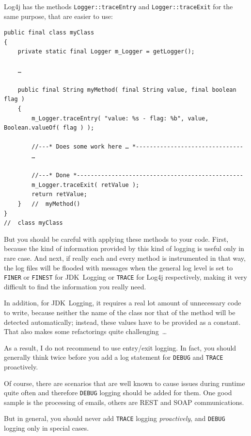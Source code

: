 \documentclass[11pt,a4paper, titlepage, parskip=half, headsepline, footsepline, cleardoublepage=current, headheight=1cm]{scrbook}
\begin{document}
Log4j has the methods \lstinline|Logger::traceEntry| and \lstinline|Logger::traceExit| for the same purpose, that are easier to use:
\begin{lstlisting}
public final class myClass
{
    private static final Logger m_Logger = getLogger();
    
	…    
    
    public final String myMethod( final String value, final boolean flag )
    {
        m_Logger.traceEntry( "value: %s - flag: %b", value, Boolean.valueOf( flag ) );
        
        //---* Does some work here … *-------------------------------
        …
    
        //---* Done *------------------------------------------------
        m_Logger.traceExit( retValue );
        return retValue;
    }   //  myMethod()
}
//  class myClass
\end{lstlisting}

But you should be careful with applying these methods to your code. First, because the kind of information provided by this kind of logging is useful only in rare case. And next, if really each and every method is instrumented in that way, the log files will be flooded with messages when the general log level is set to \verb#FINER# or \verb#FINEST# for JDK~Logging or \verb#TRACE# for Log4j respectively, making it very difficult to find the information you really need.

In addition, for JDK~Logging, it requires a real lot amount of unnecessary code to write, because neither the name of the class nor that of the method will be detected automatically; instead, these values have to be provided as a constant. That also makes some refactorings quite challenging~…

As a result, I do not recommend to use entry/exit logging. In fact, you should generally think twice before you add a log statement for \verb#DEBUG# and \verb#TRACE# proactively.

Of course, there are scenarios that are well known to cause issues during runtime quite often and therefore \verb#DEBUG# logging should be added for them. One good sample is the processing of emails, others are REST and SOAP communications.

But in general, you should never add \verb#TRACE# logging \textit{proactively}, and \verb#DEBUG# logging only in special cases.
\end{document}
